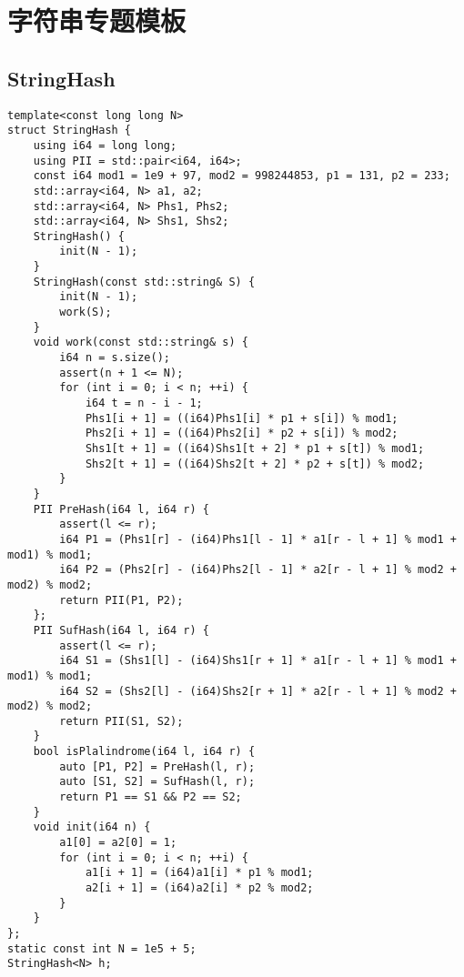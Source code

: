\section{字符串专题模板}
\subsection{StringHash}
\begin{lstlisting}
template<const long long N>
struct StringHash {
    using i64 = long long;
    using PII = std::pair<i64, i64>;
    const i64 mod1 = 1e9 + 97, mod2 = 998244853, p1 = 131, p2 = 233;
    std::array<i64, N> a1, a2;
    std::array<i64, N> Phs1, Phs2;
    std::array<i64, N> Shs1, Shs2;
    StringHash() {
        init(N - 1);
    }
    StringHash(const std::string& S) {
        init(N - 1);
        work(S);
    }
    void work(const std::string& s) {  
        i64 n = s.size();
        assert(n + 1 <= N);
        for (int i = 0; i < n; ++i) {
            i64 t = n - i - 1;
            Phs1[i + 1] = ((i64)Phs1[i] * p1 + s[i]) % mod1;
            Phs2[i + 1] = ((i64)Phs2[i] * p2 + s[i]) % mod2;
            Shs1[t + 1] = ((i64)Shs1[t + 2] * p1 + s[t]) % mod1;
            Shs2[t + 1] = ((i64)Shs2[t + 2] * p2 + s[t]) % mod2;
        }
    }
    PII PreHash(i64 l, i64 r) {
        assert(l <= r);
        i64 P1 = (Phs1[r] - (i64)Phs1[l - 1] * a1[r - l + 1] % mod1 + mod1) % mod1;
        i64 P2 = (Phs2[r] - (i64)Phs2[l - 1] * a2[r - l + 1] % mod2 + mod2) % mod2;
        return PII(P1, P2);
    };
    PII SufHash(i64 l, i64 r) {
        assert(l <= r);
        i64 S1 = (Shs1[l] - (i64)Shs1[r + 1] * a1[r - l + 1] % mod1 + mod1) % mod1;
        i64 S2 = (Shs2[l] - (i64)Shs2[r + 1] * a2[r - l + 1] % mod2 + mod2) % mod2;
        return PII(S1, S2);
    }
    bool isPlalindrome(i64 l, i64 r) {
        auto [P1, P2] = PreHash(l, r);
        auto [S1, S2] = SufHash(l, r);
        return P1 == S1 && P2 == S2;
    }
    void init(i64 n) {
        a1[0] = a2[0] = 1;
        for (int i = 0; i < n; ++i) {
            a1[i + 1] = (i64)a1[i] * p1 % mod1;
            a2[i + 1] = (i64)a2[i] * p2 % mod2;
        }
    }
};
static const int N = 1e5 + 5;
StringHash<N> h;
\end{lstlisting}




